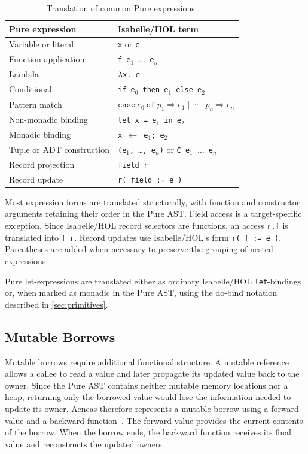 \begin{table}[!ht]
  \centering
  \caption{Translation of common Pure expressions.}
  \label{tab:expression-map}
  \small
  \begin{tabular}{@{}p{}p{}@{}}
    \toprule
    \textbf{Pure expression} & \textbf{Isabelle/HOL term} \\
    \midrule
    Variable or literal
      & \texttt{x} or \texttt{c} \\
    Function application
      & \texttt{f e$_1$ $\ldots$ e$_n$} \\
    Lambda
      & \texttt{$\lambda$x. e} \\
    Conditional
      & \texttt{if e$_0$ then e$_1$ else e$_2$} \\
    Pattern match
      & $\mathtt{case}\ e_0\ \mathtt{of}\ 
     p_1 \Rightarrow e_1 \mid \cdots \mid p_n \Rightarrow e_n$ \\
    Non-monadic binding
      & \texttt{let x = e$_1$ in e$_2$} \\
    Monadic binding
      & \texttt{x $\leftarrow$ e$_1$; e$_2$} \\
    Tuple or ADT construction
      & \texttt{(e$_1$, \ldots, e$_n$)} or
        \texttt{C e$_1$ $\ldots$ e$_n$} \\
    Record projection
      & \texttt{field r} \\
    Record update
      & \texttt{r(\textbar{} field := e \textbar{})} \\
    \bottomrule
  \end{tabular}
\end{table}

Most expression forms are translated structurally, with function and constructor arguments retaining their order in the Pure AST. Field access is a target-specific exception. Since Isabelle/HOL record selectors are functions, an access \texttt{r.f} is translated into \texttt{f r}. Record updates use Isabelle/HOL's form \texttt{r(\textbar{} f := e \textbar{})}. Parentheses are added when necessary to preserve the grouping of nested expressions.

Pure let-expressions are translated either as ordinary Isabelle/HOL
\texttt{let}-bindings or, when marked as monadic in the Pure AST, using the do-bind notation described in \autoref{sec:primitives}.

\subsection{Mutable Borrows}
\label{sec:mutable-borrows}
Mutable borrows require additional functional structure.  A mutable reference
allows a callee to read a value and later propagate its updated value back to
the owner.  Since the Pure AST contains neither mutable memory locations nor a
heap, returning only the borrowed value would lose the information needed to
update its owner.  Aeneas therefore represents a mutable borrow using a
forward value and a backward function~\cite{ho2022aeneas}.  The forward value
provides the current contents of the borrow.  When the borrow ends, the
backward function receives its final value and reconstructs the updated
owners.

